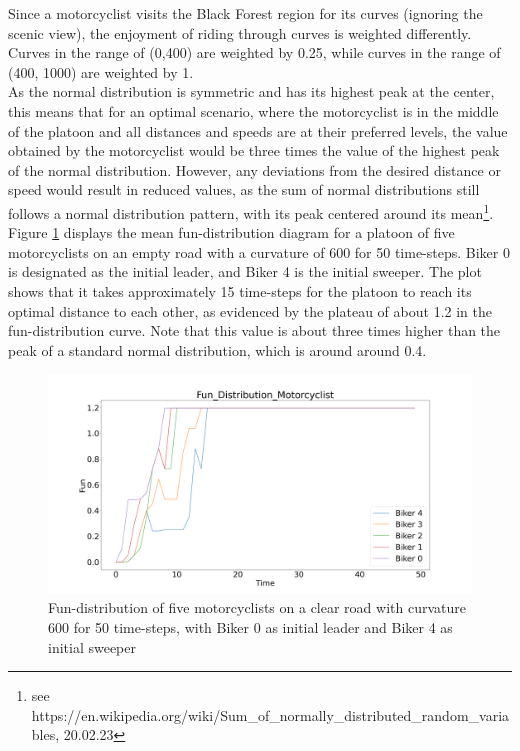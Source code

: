 Since a motorcyclist visits the Black Forest region for its curves (ignoring the scenic view), the enjoyment of riding through curves is weighted differently. Curves in the range of (0,400) are weighted by 0.25, while curves in the range of (400, 1000) are weighted by 1.\\

As the normal distribution is symmetric and has its highest peak at the center, this means that for an optimal scenario, where the motorcyclist is in the middle of the platoon and all distances and speeds are at their preferred levels, the value obtained by the motorcyclist would be three times the value of the highest peak of the normal distribution. However, any deviations from the desired distance or speed would result in reduced values, as the sum of normal distributions still follows a normal distribution pattern, with its peak centered around its mean\footnote{see https://en.wikipedia.org/wiki/Sum\_of\_normally\_distributed\_random\_variables, 20.02.23}. Figure \ref{fig:fun_distribution_clear_road} displays the mean fun-distribution diagram for a platoon of five motorcyclists on an empty road with a curvature of 600 for 50 time-steps. Biker 0 is designated as the initial leader, and Biker 4 is the initial sweeper. The plot shows that it takes approximately 15 time-steps for the platoon to reach its optimal distance to each other, as evidenced by the plateau of about 1.2 in the fun-distribution curve. Note that this value is about three times higher than the peak of a standard normal distribution, which is around around 0.4.\\

\begin{figure}[h]
    \centering
    \includegraphics[width=1.0\linewidth]{images/fun_distribution_free_road.png}
    \caption{Fun-distribution of five motorcyclists on a clear road with curvature 600 for 50 time-steps, with Biker 0 as initial leader and Biker 4 as initial sweeper}
    \label{fig:fun_distribution_clear_road}
\end{figure}

